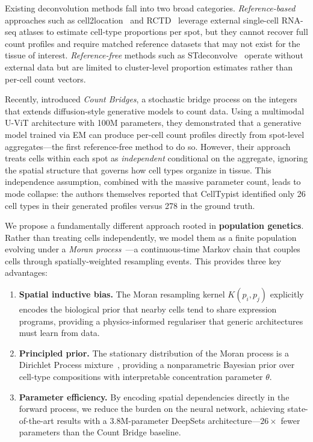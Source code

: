 \documentclass[11pt]{article}
\begin{document}
Existing deconvolution methods fall into two broad categories. \emph{Reference-based} approaches such as cell2location~\citep{kleshchevnikov2022cell2location} and RCTD~\citep{cable2022rctd} leverage external single-cell RNA-seq atlases to estimate cell-type proportions per spot, but they cannot recover full count profiles and require matched reference datasets that may not exist for the tissue of interest. \emph{Reference-free} methods such as STdeconvolve~\citep{miller2022stdeconvolve} operate without external data but are limited to cluster-level proportion estimates rather than per-cell count vectors.

Recently, \citet{fishman2025count} introduced \emph{Count Bridges}, a stochastic bridge process on the integers that extends diffusion-style generative models to count data. Using a multimodal U-ViT architecture with 100M parameters, they demonstrated that a generative model trained via EM can produce per-cell count profiles directly from spot-level aggregates---the first reference-free method to do so. However, their approach treats cells within each spot as \emph{independent} conditional on the aggregate, ignoring the spatial structure that governs how cell types organize in tissue. This independence assumption, combined with the massive parameter count, leads to mode collapse: the authors themselves reported that CellTypist identified only 26 cell types in their generated profiles versus 278 in the ground truth.

We propose a fundamentally different approach rooted in \textbf{population genetics}. Rather than treating cells independently, we model them as a finite population evolving under a \emph{Moran process}~\citep{moran1958random}---a continuous-time Markov chain that couples cells through spatially-weighted resampling events. This provides three key advantages:

\begin{enumerate}[leftmargin=*]
  \item \textbf{Spatial inductive bias.} The Moran resampling kernel $K(p_i, p_j)$ explicitly encodes the biological prior that nearby cells tend to share expression programs, providing a physics-informed regulariser that generic architectures must learn from data.
  \item \textbf{Principled prior.} The stationary distribution of the Moran process is a Dirichlet Process mixture~\citep{ferguson1973bayesian, sethuraman1994constructive}, providing a nonparametric Bayesian prior over cell-type compositions with interpretable concentration parameter $\theta$.
  \item \textbf{Parameter efficiency.} By encoding spatial dependencies directly in the forward process, we reduce the burden on the neural network, achieving state-of-the-art results with a 3.8M-parameter DeepSets architecture---$26\times$ fewer parameters than the Count Bridge baseline.
\end{enumerate}
\end{document}
